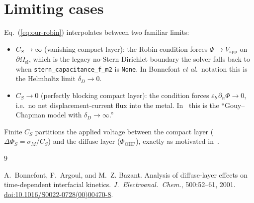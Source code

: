 \documentclass[11pt]{article}
\newcommand{\OHP}{\mathrm{OHP}}
\newcommand{\CS}{C_{\!S}}
\newcommand{\eb}{\varepsilon_{b}}
\begin{document}
\section{Limiting cases}

Eq.~(\ref{eq:our-robin}) interpolates between two familiar limits:
\begin{itemize}
\item $\CS\to\infty$ (vanishing compact layer): the Robin condition
forces $\Phi\to V_{\mathrm{app}}$ on $\partial\Omega_{\mathrm{el}}$,
which is the legacy no-Stern Dirichlet boundary the solver falls back
to when \texttt{stern\_capacitance\_f\_m2} is \texttt{None}. In
Bonnefont \emph{et al.}~notation this is the Helmholtz limit
$\delta_{D}\to 0$.
\item $\CS\to 0$ (perfectly blocking compact layer): the condition
forces $\eb\,\partial_{n}\Phi\to 0$, i.e.\ no net displacement-current
flux into the metal. In~\cite{bonnefont2001} this is the
``Gouy--Chapman model with $\delta_{D}\to\infty$.''
\end{itemize}
Finite $\CS$ partitions the applied voltage between the compact layer
($\Delta\Phi_{S}=\sigma_{M}/\CS$) and the diffuse layer
($\Phi_{\OHP}$), exactly as motivated in~\cite[\S2.2]{bonnefont2001}.

\begin{thebibliography}{9}

A.~Bonnefont, F.~Argoul, and M.~Z. Bazant.
\newblock Analysis of diffuse-layer effects on time-dependent interfacial
  kinetics.
\newblock \emph{J.~Electroanal.~Chem.}, 500:52--61, 2001.
\newblock \href{https://doi.org/10.1016/S0022-0728(00)00470-8}%
              {doi:10.1016/S0022-0728(00)00470-8}.

\end{thebibliography}
\end{document}
